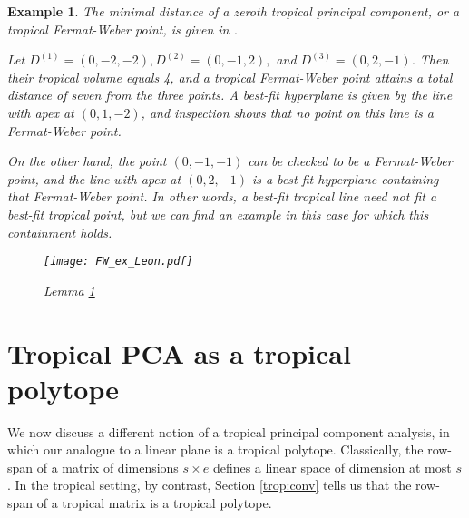 \documentclass[12pt]{extarticle}
\numberwithin{theorem}{section}
\newtheorem{example}[theorem]{Example}
\begin{document}
\begin{example}
\label{fermat-weber-noncontainment}
The minimal distance of a zeroth tropical principal component, or a \emph{tropical Fermat-Weber point}, is given in \cite[Theorem 3]{LY}.

Let $D^{(1)} = (0, -2, -2), D^{(2)} = (0, -1, 2),$ and $D^{(3)} = (0, 2, -1)$. Then their tropical volume equals 4, and a tropical Fermat-Weber point attains a total distance of seven from the three points. A best-fit hyperplane is given by the line with apex at $(0, 1, -2)$, and inspection shows that no point on this line is a Fermat-Weber point.

On the other hand, the point $(0, -1, -1)$ can be checked to be a Fermat-Weber point, and the line with apex at $(0, 2, -1)$ is a best-fit hyperplane containing that Fermat-Weber point. In other words, a best-fit tropical line need not fit a best-fit tropical point, but we can find an example in this case for which this containment holds.

\begin{figure}[!ht]
\centering
\texttt{[image: FW\_ex\_Leon.pdf]}
\caption{Lemma \ref{fermat-weber-noncontainment}}
\label{FW-noncontainment-picture}
\end{figure}
\end{example}

\section{Tropical PCA as a tropical polytope}\label{trop:poly}

We now discuss a different notion of a tropical principal component analysis, in which our analogue to a linear plane is a tropical polytope. Classically, the row-span of a matrix of dimensions $s\times e$ defines a linear space of dimension at most $s$. In the tropical setting, by contrast, Section \ref{trop:conv} tells us that the row-span of a tropical matrix is a tropical polytope.

\end{document}
